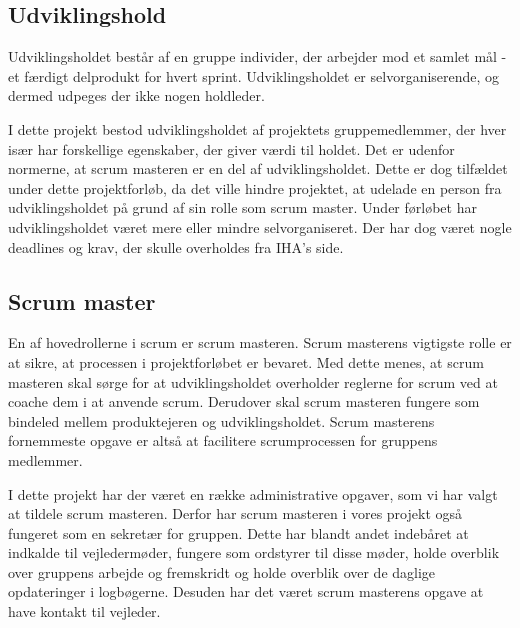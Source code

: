 \subsection{Udviklingshold}
Udviklingsholdet består af en gruppe individer, der arbejder mod et samlet mål - et færdigt delprodukt for hvert sprint. Udviklingsholdet er selvorganiserende, og dermed udpeges der ikke nogen holdleder.

I dette projekt bestod udviklingsholdet af projektets gruppemedlemmer, der hver især har forskellige egenskaber, der giver værdi til holdet. Det er udenfor normerne, at scrum masteren er en del af udviklingsholdet. Dette er dog tilfældet under dette projektforløb, da det ville hindre projektet, at udelade en person fra udviklingsholdet på grund af sin rolle som scrum master.
Under førløbet har udviklingsholdet været mere eller mindre selvorganiseret. Der har dog været nogle deadlines og krav, der skulle overholdes fra IHA's side.

\subsection{Scrum master}
En af hovedrollerne i scrum er scrum masteren. Scrum masterens vigtigste rolle er at sikre, at processen i projektforløbet er bevaret. Med dette menes, at scrum masteren skal sørge for at udviklingsholdet overholder reglerne for scrum ved at coache dem i at anvende scrum. Derudover skal scrum masteren fungere som bindeled mellem produktejeren og udviklingsholdet. Scrum masterens fornemmeste opgave er altså at facilitere scrumprocessen for gruppens medlemmer. 

I dette projekt har der været en række administrative opgaver, som vi har valgt at tildele scrum masteren. Derfor har scrum masteren i vores projekt også fungeret som en sekretær for gruppen. Dette har blandt andet indebåret at indkalde til vejledermøder, fungere som ordstyrer til disse møder, holde overblik over gruppens arbejde og fremskridt og holde overblik over de daglige opdateringer i logbøgerne. Desuden har det været scrum masterens opgave at have kontakt til vejleder. 


